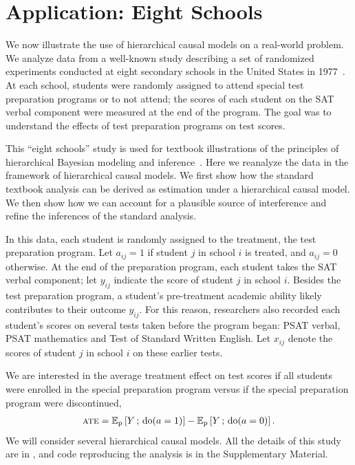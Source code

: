 \documentclass[12pt]{article}
\newcommand{\EE}[2]{\mathbb{E}_{#1}\left[ #2 \right]}
\newcommand{\rmdo}{\mathrm{do}}
\newcommand{\s}{\, ; \,}
\newcommand{\pr}{\mathrm{p}}
\begin{document}
 \section{Application: Eight Schools}
\label{sec:eight_schools}

We now illustrate the use of hierarchical causal models on a
real-world problem. We analyze data from a well-known study describing a
set of randomized experiments conducted at eight secondary schools in
the United States in 1977~\citep{Alderman1979-on}. At each school,
students were randomly assigned to attend special test preparation
programs or to not attend; the scores of each student on the SAT
verbal component were measured at the end of the program. The goal was
to understand the effects of test preparation programs on test scores.

This ``eight schools'' study is used for textbook illustrations of the
principles of hierarchical Bayesian modeling and
inference~\citep{Rubin1981-ob,Gelman2013-cv}. Here we reanalyze the
data in the framework of hierarchical causal models. We first show how
the standard textbook analysis can be derived as estimation under a
hierarchical causal model. We then show how we can account for a
plausible source of interference and refine the inferences of the
standard analysis.

In this data, each student is randomly assigned to the treatment, the
test preparation program. Let $a_{ij} = 1$ if student $j$ in school
$i$ is treated, and $a_{ij} = 0$ otherwise. At the end of the
preparation program, each student takes the SAT verbal component; let
$y_{ij}$ indicate the score of student $j$ in school $i$. Besides the
test preparation program, a student's pre-treatment academic ability
likely contributes to their outcome $y_{ij}$. For this reason,
researchers also recorded each student's scores on several tests taken
before the program began: PSAT verbal, PSAT mathematics and Test of
Standard Written English. Let $x_{ij}$ denote the scores of student
$j$ in school $i$ on these earlier tests.

We are interested in the average treatment effect on test scores if
all students were enrolled in the special preparation program versus
if the special preparation program were discontinued,
\begin{align}
  \textsc{ate} =
  \EE{\pr}{Y \s \rmdo(a = 1)} -
  \EE{\pr}{Y \s \rmdo(a = 0)}.
\end{align}
We will consider several hierarchical causal models. All the details
of this study are in , and code reproducing the analysis is in the Supplementary Material.
\end{document}
